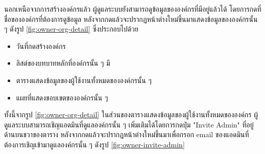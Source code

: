 \clearpage

\ifenglish \else
นอกเหนือจากการสร้างองค์กรแล้ว ผู้ดูแลระบบยังสามารถดูข้อมูลขององค์กรที่มีอยู่แล้วได้ โดยการกดที่ชื่อขององค์กรที่ต้องการดูข้อมูล หลังจากกดแล้วจะปรากฏหน้าต่างใหม่ขึ้นมาแสดงข้อมูลขององค์กรนั้น ๆ ดังรูป \ref{fig:owner-org-detail} ซึ่งประกอบไปด้วย
\begin{itemize}
    \item วันที่กดสร้างองค์กร
    \item ลิสต์ของบทบาทหลักที่องค์กรนั้น ๆ มี
    \item ตารางแสดงข้อมูลของผู้ใช้งานทั้งหมดขององค์กรนั้น ๆ
    \item แผยที่แสดงขอบเขตขององค์กรนั้น ๆ
\end{itemize}
ทั้งนี้จากรูป \ref{fig:owner-org-detail} ในส่วนของตารางแสดงข้อมูลของผู้ใช้งานทั้งหมดขององค์กร ผู้ดูแลระบบสามารถเชิญแอดมินที่ดูแลองค์กรนั้น ๆ เพิ่มเติมได้โดยการกดปุ่ม "Invite Admin" ที่อยู่ด้านบนขวาของตาราง หลังจากกดแล้วจะปรากฏหน้าต่างใหม่ขึ้นมาเพื่อกรอก email ของแอดมินที่ต้องการเชิญเข้ามาดูแลองค์กรนั้น ๆ ดังรูป \ref{fig:owner-invite-admin}
\fi


\clearpage
{}
